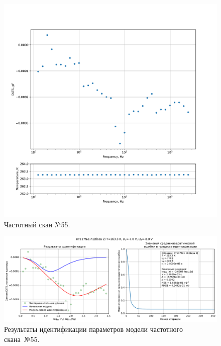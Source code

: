 \begin{figure}[!ht]
    \centering
    \includegraphics[width=1\textwidth]{../plots/КТ117№1_п1(база 2)_2500Гц-1Гц_1пФ_-10С_-7В-8В_20мВ_20мкс_шаг_0,1.pdf}
    \caption{Частотный скан №55.}
    \label{pic:frequency_scan_55}
\end{figure}

\begin{figure}[!ht]
    \centering
    \includegraphics[width=1\textwidth]{../plots/КТ117№1_п1(база 2)_2500Гц-1Гц_1пФ_-10С_-7В-8В_20мВ_20мкс_шаг_0,1_model.pdf}
    \caption{Результаты идентификации параметров модели частотного скана~№55.}
    \label{pic:frequency_scan_model55}
\end{figure}

\pagebreak


